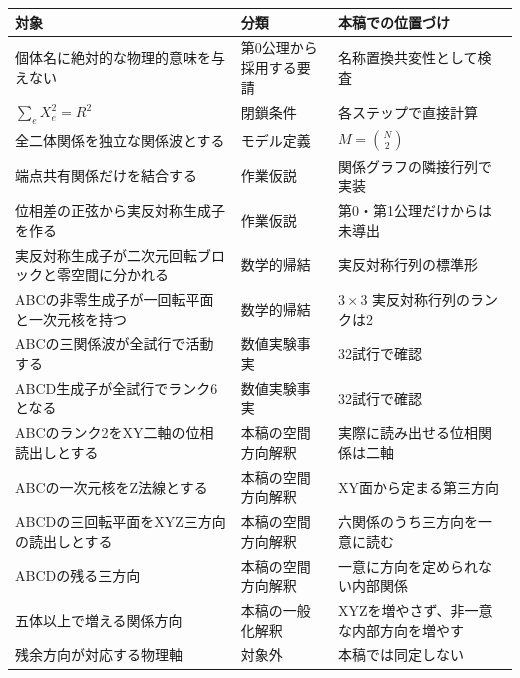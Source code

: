\documentclass[
  10pt,
  a4paper,
]{article}
\newcounter{none} %
\begin{document}
{\def\LTcaptype{none} %
\begin{landscape}
\begingroup\scriptsize
\begin{longtable}[]{@{}
  >{\raggedright\arraybackslash}p{}
  >{\raggedright\arraybackslash}p{}
  >{\raggedright\arraybackslash}p{}@{}}
\toprule\noalign{}
\begin{minipage}[b]{\linewidth}\raggedright
対象
\end{minipage} & \begin{minipage}[b]{\linewidth}\raggedright
分類
\end{minipage} & \begin{minipage}[b]{\linewidth}\raggedright
本稿での位置づけ
\end{minipage} \\
\midrule\noalign{}
\endhead
\bottomrule\noalign{}
\endlastfoot
個体名に絶対的な物理的意味を与えない & 第0公理から採用する要請 &
名称置換共変性として検査 \\
\(\sum_e X_e^2=R^2\) & 閉鎖条件 & 各ステップで直接計算 \\
全二体関係を独立な関係波とする & モデル定義 & \(M=\binom{N}{2}\) \\
端点共有関係だけを結合する & 作業仮説 & 関係グラフの隣接行列で実装 \\
位相差の正弦から実反対称生成子を作る & 作業仮説 &
第0・第1公理だけからは未導出 \\
実反対称生成子が二次元回転ブロックと零空間に分かれる & 数学的帰結 &
実反対称行列の標準形 \\
ABCの非零生成子が一回転平面と一次元核を持つ & 数学的帰結 & \(3\times3\)
実反対称行列のランクは2 \\
ABCの三関係波が全試行で活動する & 数値実験事実 & 32試行で確認 \\
ABCD生成子が全試行でランク6となる & 数値実験事実 & 32試行で確認 \\
ABCのランク2をXY二軸の位相読出しとする & 本稿の空間方向解釈 &
実際に読み出せる位相関係は二軸 \\
ABCの一次元核をZ法線とする & 本稿の空間方向解釈 &
XY面から定まる第三方向 \\
ABCDの三回転平面をXYZ三方向の読出しとする & 本稿の空間方向解釈 &
六関係のうち三方向を一意に読む \\
ABCDの残る三方向 & 本稿の空間方向解釈 &
一意に方向を定められない内部関係 \\
五体以上で増える関係方向 & 本稿の一般化解釈 &
XYZを増やさず、非一意な内部方向を増やす \\
残余方向が対応する物理軸 & 対象外 & 本稿では同定しない \\
\end{longtable}
\endgroup
\end{landscape}
}
\end{document}
